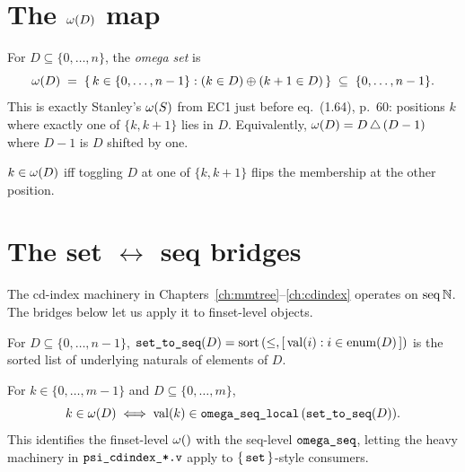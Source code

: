 \section{The $\omega(D)$ map}

\begin{definition}
  \label{def:omega_set}
  \rocqok
  For $D \subseteq \{0, \dots, n\}$, the \emph{omega set} is
  \[
    \omega(D)
    \;=\;
    \{\, k \in \{0, \dots, n-1\} : (k \in D) \oplus (k+1 \in D)\,\}
    \;\subseteq\;
    \{0, \dots, n-1\}.
  \]
  This is exactly Stanley's $\omega(S)$ from EC1 just before eq.~(1.64),
  p.~60: positions $k$ where exactly one of $\{k, k+1\}$ lies in $D$.
  Equivalently, $\omega(D) = D \,\triangle\, (D - 1)$ where $D - 1$
  is $D$ shifted by one.
\end{definition}

\begin{lemma}
  \label{lem:mem_omega_set}
  \rocqok
  $k \in \omega(D)$ iff toggling $D$ at one of $\{k, k+1\}$ flips
  the membership at the other position.
\end{lemma}

\section{The set $\leftrightarrow$ seq bridges}

The cd-index machinery in Chapters~\ref{ch:mmtree}--\ref{ch:cdindex}
operates on $\mathrm{seq}\,\mathbb{N}$.  The bridges below let us apply it to
finset-level objects.

\begin{definition}
  \label{def:set_to_seq}
  \rocqok
  For $D \subseteq \{0, \dots, n-1\}$,
  $\texttt{set\_to\_seq}(D) = \mathrm{sort}\,(\leq, [\,\mathrm{val}(i) :
  i \in \mathrm{enum}(D)\,])$ is the sorted list of underlying naturals
  of elements of $D$.
\end{definition}

\begin{lemma}
  \label{lem:omega_set_seq_local_bridge}
  \rocqok
  For $k \in \{0, \dots, m-1\}$ and $D \subseteq \{0, \dots, m\}$,
  \[
    k \in \omega(D)
    \;\Longleftrightarrow\;
    \mathrm{val}(k) \in \texttt{omega\_seq\_local}\,(\texttt{set\_to\_seq}(D)).
  \]
  This identifies the finset-level $\omegaSet$ with the seq-level
  $\texttt{omega\_seq}$, letting the heavy machinery in
  $\texttt{psi\_cdindex\_*.v}$ apply to $\{\,\texttt{set}\,\}$-style
  consumers.
\end{lemma}

